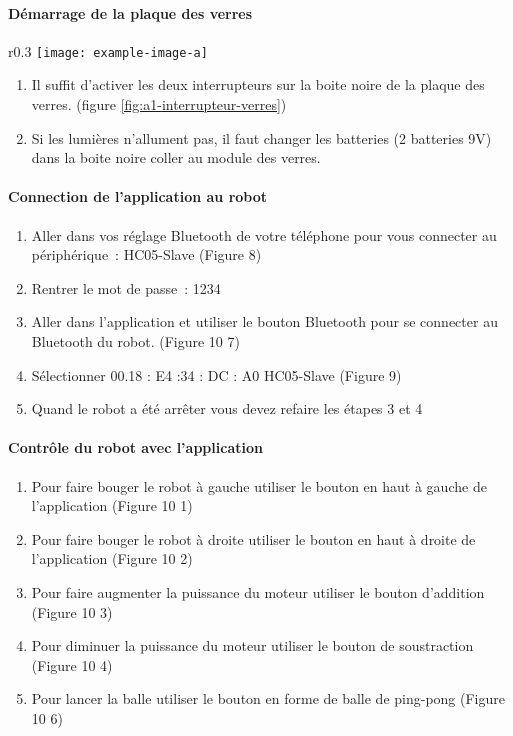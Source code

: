 \paragraph{Démarrage de la plaque des verres}

\begin{wrapfigure}{r}{0.3\linewidth}
    \centering
    \texttt{[image: example-image-a]}
    \caption{Interrupteur de mise en marche de la plaque de verres}
    \label{fig:a1-interrupteur-verres}
\end{wrapfigure}

\begin{enumerate}
    \item Il suffit d’activer les deux interrupteurs sur la boite noire de la plaque des verres. (figure \ref{fig:a1-interrupteur-verres})
    \item Si les lumières n’allument pas, il faut changer les batteries (2 batteries 9V) dans la boite noire coller au module des verres.
\end{enumerate}

\paragraph{Connection de l'application au robot}


\begin{enumerate}
    \item Aller dans vos réglage Bluetooth de votre téléphone pour vous connecter au périphérique : HC05-Slave (Figure 8)
    \item Rentrer le mot de passe : 1234
    \item Aller dans l’application et utiliser le bouton Bluetooth pour se connecter au Bluetooth du robot. (Figure 10 7)
    \item Sélectionner 00.18 : E4 :34 : DC : A0 HC05-Slave (Figure 9)
    \item Quand le robot a été arrêter vous devez refaire les étapes 3 et 4
\end{enumerate}

\paragraph{Contrôle du robot avec l’application}


\begin{enumerate}
    \item Pour faire bouger le robot à gauche utiliser le bouton en haut à gauche de l’application (Figure 10 1)
    \item Pour faire bouger le robot à droite utiliser le bouton en haut à droite de l’application (Figure 10 2)
    \item Pour faire augmenter la puissance du moteur utiliser le bouton d’addition (Figure 10 3)
    \item Pour diminuer la puissance du moteur utiliser le bouton de soustraction (Figure 10 4)
    \item Pour lancer la balle utiliser le bouton en forme de balle de ping-pong (Figure 10 6)
\end{enumerate}
